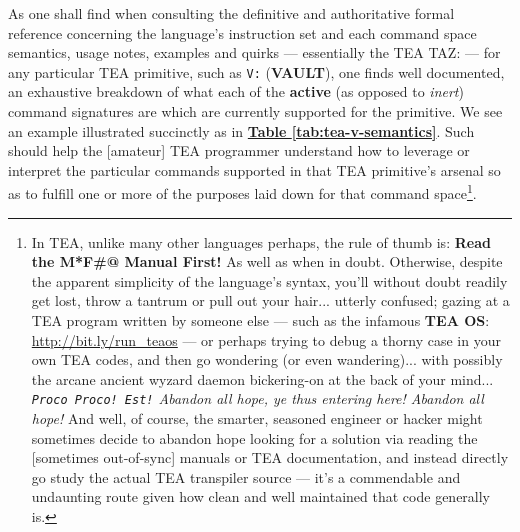 \documentclass[acmtoplas]{acmart}
\begin{document}
As one shall find when consulting the definitive and authoritative formal reference concerning the language's instruction set and each command space semantics, usage notes, examples and quirks --- essentially the TEA TAZ: \cite{Lutalo2024TEATAZ} --- for any particular TEA primitive, such as \texttt{V:} (\textbf{VAULT}), one finds well documented, an exhaustive breakdown of what each of the \textbf{active} (as opposed to \textit{inert}) command signatures are which are currently supported for the primitive. We see an example illustrated succinctly as in \textbf{\hyperref[tab:tea-v-semantics]{Table \ref{tab:tea-v-semantics}}}. Such should help the [amateur] TEA programmer understand how to leverage or interpret the particular commands supported in that TEA primitive's arsenal so as to fulfill one or more of the purposes laid down for that command space\footnote{In TEA, unlike many other languages perhaps, the rule of thumb is: \textbf{Read the M*F\#@ Manual First!} As well as when in doubt. Otherwise, despite the apparent simplicity of the language's syntax, you'll without doubt readily get lost, throw a tantrum or pull out your hair... utterly confused; gazing at a TEA program written by someone else --- such as the infamous \textbf{TEA OS}: \url{http://bit.ly/run_teaos} --- or perhaps trying to debug a thorny case in your own TEA codes, and then go wondering (or even wandering)... with possibly the arcane ancient wyzard daemon bickering-on at the back of your mind... \textit{\texttt{Proco Proco! Est!} Abandon all hope, ye thus entering here! Abandon all hope!} And well, of course, the smarter, seasoned engineer or hacker might sometimes decide to abandon hope looking for a solution via reading the [sometimes out-of-sync] manuals or TEA documentation, and instead directly go study the actual TEA transpiler source \cite{cli_tttt} --- it's a commendable and undaunting route given how clean and well maintained that code generally is.}. 
\end{document}
